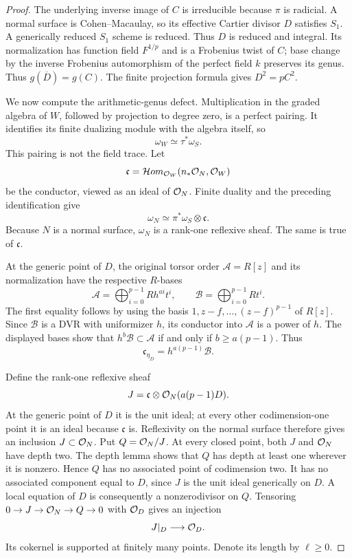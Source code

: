 \begin{proof}
The underlying inverse image of $C$ is irreducible because $\pi$
is radicial. A normal surface is Cohen--Macaulay, so its effective
Cartier divisor $D$ satisfies $S_1$. A generically reduced
$S_1$ scheme is reduced. Thus $D$ is reduced and integral.
Its normalization has function field $F^{1/p}$ and is a
Frobenius twist of $C$; base change by the inverse Frobenius
automorphism of the perfect field $k$ preserves its genus.
Thus $g(\overline D)=g(C)$. The finite projection formula gives
$D^2=pC^2$.

We now compute the arithmetic-genus defect. Multiplication in the
graded algebra of $W$, followed by projection to degree zero, is a
perfect pairing. It identifies its finite dualizing module with
the algebra itself, so
\[
 \omega_W\simeq\tau^*\omega_S.
\]
This pairing is not the field trace. Let
\[
 \mathfrak c
   =\mathcal Hom_{\mathcal O_W}(n_*\mathcal O_N,\mathcal O_W)
\]
be the conductor, viewed as an ideal of $\mathcal O_N$. Finite duality
and the preceding identification give
\[
 \omega_N\simeq\pi^*\omega_S\otimes\mathfrak c.
\]
Because $N$ is a normal surface, $\omega_N$ is a rank-one
reflexive sheaf. The same is true of $\mathfrak c$.

At the generic point of $D$, the original torsor order
$\mathcal A=R[z]$ and its normalization have the respective
$R$-bases
\[
 \mathcal A=\bigoplus_{i=0}^{p-1}Rh^{ai}t^i,
 \qquad
 \mathcal B=\bigoplus_{i=0}^{p-1}Rt^i.
\]
The first equality follows by using the basis
$1,z-f,\ldots,(z-f)^{p-1}$ of $R[z]$.
Since $\mathcal B$ is a DVR with uniformizer $h$, its conductor
into $\mathcal A$ is a power of $h$. The displayed bases show that
$h^b\mathcal B\subset\mathcal A$ if and only if
$b\geq a(p-1)$. Thus
\[
 \mathfrak c_{\eta_D}=h^{a(p-1)}\mathcal B.
\]

Define the rank-one reflexive sheaf
\[
 J=\mathfrak c\otimes\mathcal O_N(a(p-1)D).
\]
At the generic point of $D$ it is the unit ideal; at every other
codimension-one point it is an ideal because $\mathfrak c$ is.
Reflexivity on the normal surface therefore gives an inclusion
$J\subset\mathcal O_N$. Put $Q=\mathcal O_N/J$.
At every closed point, both $J$ and $\mathcal O_N$ have depth two.
The depth lemma shows that $Q$ has depth at least one wherever it
is nonzero. Hence $Q$ has no associated point of codimension two.
It has no associated component equal to $D$, since $J$ is the unit
ideal generically on $D$. A local equation of $D$ is consequently a
nonzerodivisor on $Q$. Tensoring
$0\to J\to\mathcal O_N\to Q\to0$ with $\mathcal O_D$ gives an injection
\[
 J|_D\longrightarrow\mathcal O_D.
\]
Its cokernel is supported at finitely many points. Denote its
length by $\ell\geq0$.


\end{proof}
